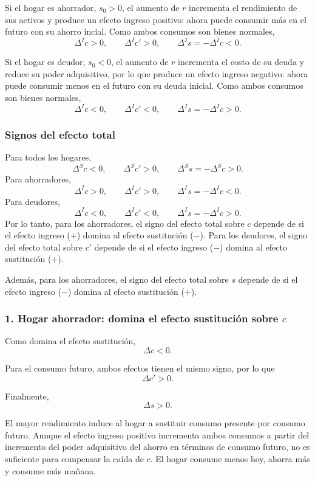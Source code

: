 \documentclass[11pt]{article}
\begin{document}
Si el hogar es ahorrador, \(s_0>0\), el aumento de \(r\) incrementa el rendimiento de sus activos y produce un efecto ingreso positivo: ahora puede consumir más en el futuro con su ahorro incial. Como ambos consumos son bienes normales,
\[
  \Delta^I c>0,
  \qquad
  \Delta^I c'>0,
  \qquad
  \Delta^I s=-\Delta^I c<0.
\]

Si el hogar es deudor, \(s_0<0\), el aumento de \(r\) incrementa el costo de su deuda y reduce su poder adquisitivo, por lo que produce un efecto ingreso negativo: ahora puede consumir menos en el futuro con su deuda inicial. Como ambos consumos son bienes normales,
\[
  \Delta^I c<0,
  \qquad
  \Delta^I c'<0,
  \qquad
  \Delta^I s=-\Delta^I c>0.
\]


\subsubsection*{Signos del efecto total}

Para todos los hogares,
\[
  \Delta^S c<0,
  \qquad
  \Delta^S c'>0,
  \qquad
  \Delta^S s=-\Delta^S c>0.
\]
Para ahorradores,
\[
  \Delta^I c>0,
  \qquad
  \Delta^I c'>0,
  \qquad
  \Delta^I s=-\Delta^I c<0.
\]
Para deudores,
\[
  \Delta^I c<0,
  \qquad
  \Delta^I c'<0,
  \qquad
  \Delta^I s=-\Delta^I c>0.
\]
Por lo tanto, para los ahorradores, el signo del efecto total sobre \(c\) depende de si el efecto ingreso ($+$) domina al efecto sustitución ($-$). Para los deudores, el signo del efecto total sobre \(c'\) depende de si el efecto ingreso ($-$) domina al efecto sustitución ($+$).

Además, para los ahorradores, el signo del efecto total sobre $s$ depende de si el efecto ingreso ($-$) domina al efecto sustitución ($+$).


\subsubsection*{1. Hogar ahorrador: domina el efecto sustitución sobre \(c\)}


Como domina el efecto sustitución,
\[
  \boxed{\Delta c<0}.
\]

Para el consumo futuro, ambos efectos tienen el mismo signo, por lo que
\[
  \boxed{\Delta c'>0}.
\]

Finalmente,
\[
  \boxed{\Delta s>0}.
\]

El mayor rendimiento induce al hogar a sustituir consumo presente por consumo futuro. Aunque el efecto ingreso positivo incrementa ambos consumos a partir del incremento del poder adquisitivo del ahorro en términos de consumo futuro, no es suficiente para compensar la caída de \(c\). El hogar consume menos hoy, ahorra más y consume más mañana.
\end{document}
